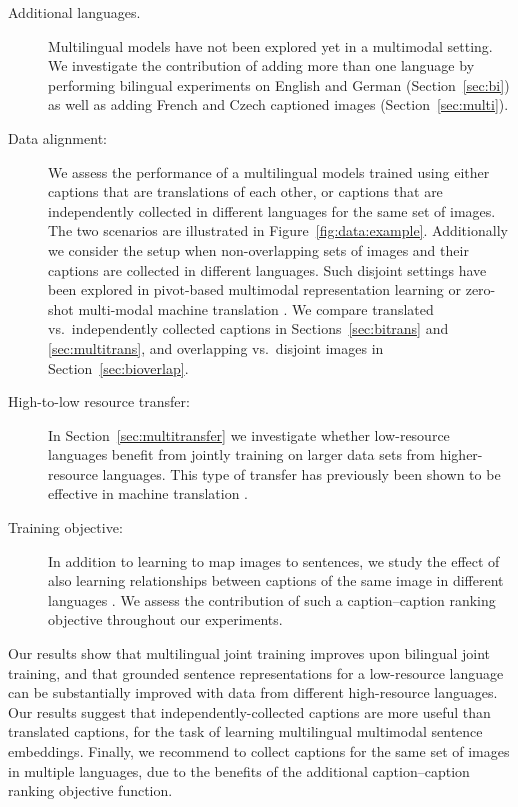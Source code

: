 \begin{description}
\item[Additional languages.]
Multilingual models have not been explored yet in a multimodal setting. We investigate the contribution of adding more than one language by performing bilingual experiments on English and German (Section~\ref{sec:bi}) as well as adding French and Czech captioned images (Section~\ref{sec:multi}).

\item[Data alignment:] We assess the performance of a multilingual models trained using either captions that are translations of each other, or captions that are independently collected in different languages for the same set of images. The two scenarios are illustrated in Figure~\ref{fig:data:example}. Additionally we consider the setup when non-overlapping sets of images and their captions are collected in different languages. Such disjoint settings have been explored in pivot-based multimodal representation learning \citep{funaki2015image,rajendran2015bridge} or zero-shot multi-modal machine translation \citep{nakayama2017zero}.
We compare translated vs.\ independently collected captions in Sections~\ref{sec:bitrans} and \ref{sec:multitrans}, and overlapping vs.\ disjoint images in Section~\ref{sec:bioverlap}.

\item[High-to-low resource transfer:] In Section~\ref{sec:multitransfer} we investigate whether low-resource languages benefit from jointly training on larger data sets from higher-resource languages. This type of transfer has previously been shown to be effective in machine translation \citep[e.g.,][]{zoph2016transfer}.

\item[Training objective:] In addition to learning to map images to sentences, we study the effect of also learning relationships between captions of the same image in different languages \citep{gella2017image}. We assess the contribution of such a caption--caption ranking objective throughout our experiments.
\end{description}
%
Our results show that multilingual joint training improves upon bilingual joint training, and that grounded sentence representations for a low-resource language can be substantially improved with data from different high-resource languages. Our results suggest that independently-collected captions are more useful than translated captions, for the task of learning multilingual multimodal sentence embeddings. Finally, we recommend to collect captions for the same set of images in multiple languages, due to the benefits of the additional caption--caption ranking objective function.

